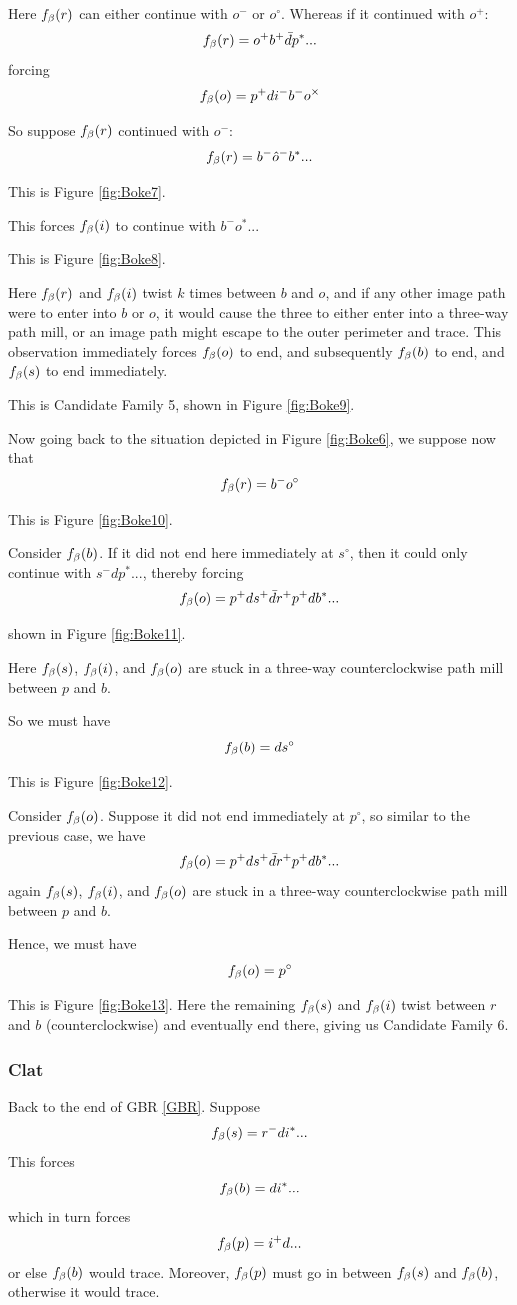 Here $f_\beta(r)$ can either continue with $o^-$ or $o^\circ$. Whereas if it continued with $o^+$:
\[
f_\beta(r) = o^+ b^+ \bar{d} p^*...
\]
forcing
\[
f_\beta(o) = p^+ d i^- b^- o^\times
\]

So suppose $f_\beta(r)$ continued with $o^-$:
\[
f_\beta(r) = b^- \hat{o}^- b^*...
\]

This is Figure \ref{fig:Boke7}.

This forces $f_\beta(i)$ to continue with $b^- o^*...$

This is Figure \ref{fig:Boke8}. 

Here $f_\beta(r)$ and $f_\beta(i)$ twist $k$ times between $b$ and $o$, and if any other image path were to enter into $b$ or $o$, it would cause the three to either enter into a three-way path mill, or an image path might escape to the outer perimeter and trace. This observation immediately forces $f_\beta(o)$ to end, and subsequently $f_\beta(b)$ to end, and $f_\beta(s)$ to end immediately.


This is Candidate Family 5, shown in Figure \ref{fig:Boke9}.

Now going back to the situation depicted in Figure \ref{fig:Boke6}, we suppose now that 
\[
f_\beta(r) = b^- o^\circ
\]

This is Figure \ref{fig:Boke10}.

Consider $f_\beta(b)$. If it did not end here immediately at $s^\circ$, then it could only continue with $s^- d p^*...$, thereby forcing
\[
f_\beta(o) = p^+ d s^+ \bar{d} r^+ p^+ d b^*...
\]

shown in Figure \ref{fig:Boke11}.

Here $f_\beta(s)$, $f_\beta(i)$, and $f_\beta(o)$ are stuck in a three-way counterclockwise path mill between $p$ and $b$.

So we must have
\[
f_\beta(b) = d s^\circ
\]

This is Figure \ref{fig:Boke12}.

Consider $f_\beta(o)$. Suppose it did not end immediately at $p^\circ$, so similar to the previous case, we have
\[
f_\beta(o) = p^+ d s^+ \bar{d} r^+ p^+ d b^*...
\]
again $f_\beta(s)$, $f_\beta(i)$, and $f_\beta(o)$ are stuck in a three-way counterclockwise path mill between $p$ and $b$.

Hence, we must have
\[
f_\beta(o) = p^\circ
\]

This is Figure \ref{fig:Boke13}. Here the remaining $f_\beta(s)$ and $f_\beta(i)$ twist between $r$ and $b$ (counterclockwise) and eventually end there, giving us Candidate Family 6.


\subsubsection{Clat}\label{Clat}
Back to the end of GBR \ref{GBR}. Suppose 
\[
f_\beta(s) = r^- d i^*...
\]
This forces
\[
f_\beta(b) = d i^*...
\]
which in turn forces
\[
f_\beta(p) = i^+ d...
\]
or else $f_\beta(b)$ would trace. Moreover, $f_\beta(p)$ must go in between $f_\beta(s)$ and $f_\beta(b)$, otherwise it would trace. 

